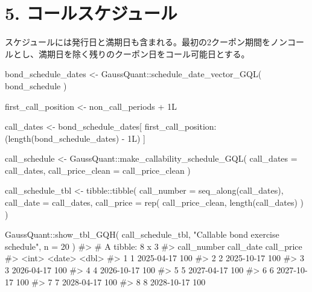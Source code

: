 \documentclass[
  letterpaper,
  DIV=11,
  numbers=noendperiod]{scrreprt}
\newenvironment{Shaded}{\begin{snugshade}}{\end{snugshade}}
\newcommand{\AttributeTok}[1]{\textcolor[rgb]{0.40,0.45,0.13}{#1}}
\newcommand{\CommentTok}[1]{\textcolor[rgb]{0.37,0.37,0.37}{#1}}
\newcommand{\DecValTok}[1]{\textcolor[rgb]{0.68,0.00,0.00}{#1}}
\newcommand{\FunctionTok}[1]{\textcolor[rgb]{0.28,0.35,0.67}{#1}}
\newcommand{\NormalTok}[1]{\textcolor[rgb]{0.00,0.23,0.31}{#1}}
\newcommand{\OtherTok}[1]{\textcolor[rgb]{0.00,0.23,0.31}{#1}}
\newcommand{\SpecialCharTok}[1]{\textcolor[rgb]{0.37,0.37,0.37}{#1}}
\newcommand{\StringTok}[1]{\textcolor[rgb]{0.13,0.47,0.30}{#1}}
\begin{document}
\section{5.
コールスケジュール}\label{ux30b3ux30fcux30ebux30b9ux30b1ux30b8ux30e5ux30fcux30eb}

スケジュールには発行日と満期日も含まれる。最初の2クーポン期間をノンコールとし、満期日を除く残りのクーポン日をコール可能日とする。

\begin{Shaded}
\begin{Highlighting}[]
\NormalTok{bond\_schedule\_dates }\OtherTok{\textless{}{-}}\NormalTok{ GaussQuant}\SpecialCharTok{::}\FunctionTok{schedule\_date\_vector\_GQL}\NormalTok{(}
\NormalTok{  bond\_schedule}
\NormalTok{)}

\NormalTok{first\_call\_position }\OtherTok{\textless{}{-}}\NormalTok{ non\_call\_periods }\SpecialCharTok{+} \DecValTok{1}\NormalTok{L}

\NormalTok{call\_dates }\OtherTok{\textless{}{-}}\NormalTok{ bond\_schedule\_dates[}
\NormalTok{  first\_call\_position}\SpecialCharTok{:}
\NormalTok{    (}\FunctionTok{length}\NormalTok{(bond\_schedule\_dates) }\SpecialCharTok{{-}} \DecValTok{1}\NormalTok{L)}
\NormalTok{]}

\NormalTok{call\_schedule }\OtherTok{\textless{}{-}}\NormalTok{ GaussQuant}\SpecialCharTok{::}\FunctionTok{make\_callability\_schedule\_GQL}\NormalTok{(}
  \AttributeTok{call\_dates =}\NormalTok{ call\_dates,}
  \AttributeTok{call\_price\_clean =}\NormalTok{ call\_price\_clean}
\NormalTok{)}

\NormalTok{call\_schedule\_tbl }\OtherTok{\textless{}{-}}\NormalTok{ tibble}\SpecialCharTok{::}\FunctionTok{tibble}\NormalTok{(}
  \AttributeTok{call\_number =} \FunctionTok{seq\_along}\NormalTok{(call\_dates),}
  \AttributeTok{call\_date =}\NormalTok{ call\_dates,}
  \AttributeTok{call\_price =} \FunctionTok{rep}\NormalTok{(}
\NormalTok{    call\_price\_clean,}
    \FunctionTok{length}\NormalTok{(call\_dates)}
\NormalTok{  )}
\NormalTok{)}

\NormalTok{GaussQuant}\SpecialCharTok{::}\FunctionTok{show\_tbl\_GQH}\NormalTok{(}
\NormalTok{  call\_schedule\_tbl,}
  \StringTok{"Callable bond exercise schedule"}\NormalTok{,}
  \AttributeTok{n =} \DecValTok{20}
\NormalTok{)}
\CommentTok{\#\textgreater{} \# A tibble: 8 x 3}
\CommentTok{\#\textgreater{}   call\_number call\_date  call\_price}
\CommentTok{\#\textgreater{}         \textless{}int\textgreater{} \textless{}date\textgreater{}          \textless{}dbl\textgreater{}}
\CommentTok{\#\textgreater{} 1           1 2025{-}04{-}17        100}
\CommentTok{\#\textgreater{} 2           2 2025{-}10{-}17        100}
\CommentTok{\#\textgreater{} 3           3 2026{-}04{-}17        100}
\CommentTok{\#\textgreater{} 4           4 2026{-}10{-}17        100}
\CommentTok{\#\textgreater{} 5           5 2027{-}04{-}17        100}
\CommentTok{\#\textgreater{} 6           6 2027{-}10{-}17        100}
\CommentTok{\#\textgreater{} 7           7 2028{-}04{-}17        100}
\CommentTok{\#\textgreater{} 8           8 2028{-}10{-}17        100}
\end{Highlighting}
\end{Shaded}
\end{document}
